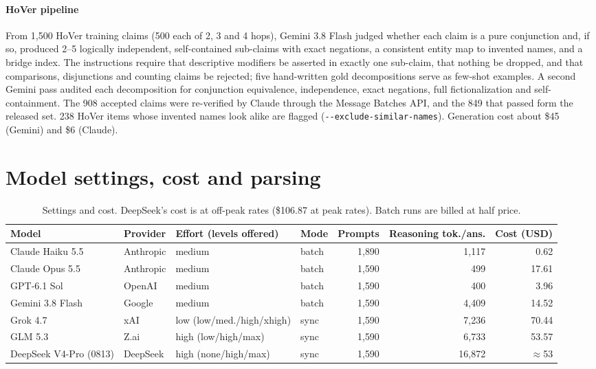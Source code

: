 \documentclass[11pt]{article}
\begin{document}
\paragraph{HoVer pipeline} From 1,500 HoVer training claims (500 each of 2, 3 and 4 hops), Gemini 3.8 Flash judged whether each claim is a pure conjunction and, if so, produced 2--5 logically independent, self-contained sub-claims with exact negations, a consistent entity map to invented names, and a bridge index. The instructions require that descriptive modifiers be asserted in exactly one sub-claim, that nothing be dropped, and that comparisons, disjunctions and counting claims be rejected; five hand-written gold decompositions serve as few-shot examples. A second Gemini pass audited each decomposition for conjunction equivalence, independence, exact negations, full fictionalization and self-containment. The 908 accepted claims were re-verified by Claude through the Message Batches API, and the 849 that passed form the released set. 238 HoVer items whose invented names look alike are flagged (\texttt{-{}-exclude-similar-names}). Generation cost about \$45 (Gemini) and \$6 (Claude).

\section{Model settings, cost and parsing}
\label{app:parse}

\begin{table}[h]
\centering\footnotesize
\begin{tabular}{@{}llllrrr@{}}
\toprule
Model & Provider & Effort (levels offered) & Mode & Prompts & Reasoning tok./ans. & Cost (USD) \\
\midrule
Claude Haiku 5.5 & Anthropic & medium & batch & 1{,}890 & 1{,}117 & 0.62 \\
Claude Opus 5.5 & Anthropic & medium & batch & 1{,}590 & 499 & 17.61 \\
GPT-6.1 Sol & OpenAI & medium & batch & 1{,}590 & 400 & 3.96 \\
Gemini 3.8 Flash & Google & medium & batch & 1{,}590 & 4{,}409 & 14.52 \\
Grok 4.7 & xAI & low (low/med./high/xhigh) & sync & 1{,}590 & 7{,}236 & 70.44 \\
GLM 5.3 & Z.ai & high (low/high/max) & sync & 1{,}590 & 6{,}733 & 53.57 \\
DeepSeek V4-Pro (0813) & DeepSeek & high (none/high/max) & sync & 1{,}590 & 16{,}872 & $\approx$53 \\
\bottomrule
\end{tabular}
\caption{Settings and cost. DeepSeek's cost is at off-peak rates (\$106.87 at peak rates). Batch runs are billed at half price.}
\end{table}
\end{document}
